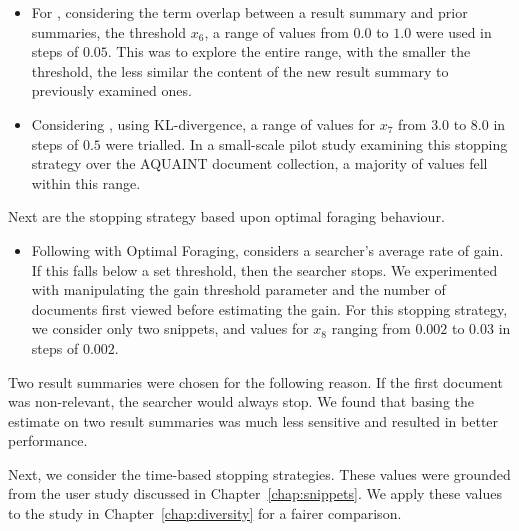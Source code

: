 \begin{itemize}
    
    \item{For , considering the term overlap between a result summary and prior summaries, the threshold $x_6$, a range of values from $0.0$ to $1.0$ were used in steps of $0.05$. This was to explore the entire range, with the smaller the threshold, the less similar the content of the new result summary to previously examined ones.}
    
    \item{Considering , using KL-divergence, a range of values for $x_7$ from $3.0$ to $8.0$ in steps of $0.5$ were trialled. In a small-scale pilot study examining this stopping strategy over the AQUAINT document collection, a majority of values fell within this range.}
    
\end{itemize}

Next are the stopping strategy based upon optimal foraging behaviour.

\begin{itemize}
    
    \item{Following with Optimal Foraging,  considers a searcher's average rate of gain. If this falls below a set threshold, then the searcher stops. We experimented with manipulating the gain threshold parameter and the number of documents first viewed before estimating the gain. For this stopping strategy, we consider only two snippets, and values for $x_8$ ranging from $0.002$ to $0.03$ in steps of $0.002$.}
    
\end{itemize}

Two result summaries were chosen for the following reason. If the first document was non-relevant, the searcher would always stop. We found that basing the estimate on two result summaries was much less sensitive and resulted in better performance.

Next, we consider the time-based stopping strategies. These values were grounded from the user study discussed in Chapter~\ref{chap:snippets}. We apply these values to the study in Chapter~\ref{chap:diversity} for a fairer comparison.

